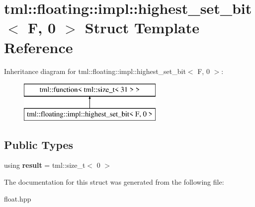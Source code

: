 \hypertarget{structtml_1_1floating_1_1impl_1_1highest__set__bit_3_01F_00_010_01_4}{\section{tml\+:\+:floating\+:\+:impl\+:\+:highest\+\_\+set\+\_\+bit$<$ F, 0 $>$ Struct Template Reference}
\label{structtml_1_1floating_1_1impl_1_1highest__set__bit_3_01F_00_010_01_4}
}
Inheritance diagram for tml\+:\+:floating\+:\+:impl\+:\+:highest\+\_\+set\+\_\+bit$<$ F, 0 $>$\+:\begin{figure}[H]
\begin{center}
\leavevmode
\includegraphics[height=2.000000cm]{structtml_1_1floating_1_1impl_1_1highest__set__bit_3_01F_00_010_01_4}
\end{center}
\end{figure}
\subsection*{Public Types}
\begin{DoxyCompactItemize}
\item 
\hypertarget{structtml_1_1floating_1_1impl_1_1highest__set__bit_3_01F_00_010_01_4_ad039a7085f81eb58b9673976f3924d33}{using {\bfseries result} = tml\+::size\+\_\+t$<$ 0 $>$}\label{structtml_1_1floating_1_1impl_1_1highest__set__bit_3_01F_00_010_01_4_ad039a7085f81eb58b9673976f3924d33}

\end{DoxyCompactItemize}


The documentation for this struct was generated from the following file\+:\begin{DoxyCompactItemize}
\item 
float.\+hpp\end{DoxyCompactItemize}
